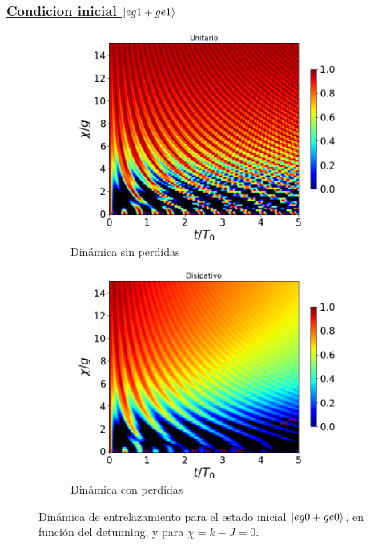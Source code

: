 \subsubsection{\underline{Condicion inicial $\ket{eg1+ge1}$}}
\begin{figure}[h]
    \centering
    \begin{subfigure}{0.49\textwidth}
        \includegraphics[width=\textwidth]{figuras/ch4/concu/chi/eg1+ge1 d=0.0g k=0.0g J=0.0g gamma=0.25g concu chi uni.png}
        \caption{Dinámica sin perdidas}
        \label{fig4:concu x 1 uni}
    \end{subfigure}
    \hfill
    \begin{subfigure}{0.49\textwidth}
        \includegraphics[width=\textwidth]{figuras/ch4/concu/chi/eg1+ge1 d=0.0g k=0.0g J=0.0g gamma=0.25g concu chi dis.png}
        \caption{Dinámica con perdidas}
        \label{fig4:concu x 1 dis}
    \end{subfigure}
    \caption{Dinámica de entrelazamiento para el estado inicial $\ket{eg0+ge0}$, en función del detunning, y para $\chi=k-J=0$.}
    \label{fig4:concu x 1}
\end{figure}

